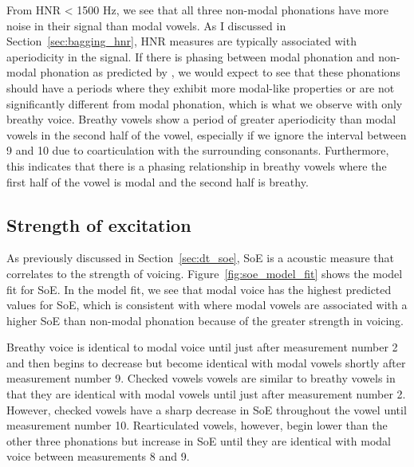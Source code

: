 From HNR < 1500 Hz, we see that all three non-modal phonations have more noise in their signal than modal vowels. As I discussed in Section~\ref{sec:bagging_hnr}, HNR measures are typically associated with aperiodicity in the signal. If there is phasing between modal phonation and non-modal phonation as predicted by \citet{silvermanLaryngealComplexityOtomanguean1997}, we would expect to see that these phonations should have a periods where they exhibit more modal-like properties or are not significantly different from modal phonation, which is what we observe with only breathy voice. Breathy vowels show a period of greater aperiodicity than modal vowels in the second half of the vowel, especially if we ignore the interval between 9 and 10 due to coarticulation with the surrounding consonants. Furthermore, this indicates that there is a phasing relationship in breathy vowels where the first half of the vowel is modal and the second half is breathy. 
\subsection{Strength of excitation} \label{sec:model_soe}

As previously discussed in Section~\ref{sec:dt_soe}, SoE is a acoustic measure that correlates to the strength of voicing. Figure~\ref{fig:soe_model_fit} shows the model fit for SoE. In the model fit, we see that modal voice has the highest predicted values for SoE, which is consistent with \citet{garellekVoicingGlottalConsonants2021} where modal vowels are associated with a higher SoE than non-modal phonation because of the greater strength in voicing. 

Breathy voice is identical to modal voice until just after measurement number 2 and then begins to decrease but become identical with modal vowels shortly after measurement number 9. Checked vowels vowels are similar to breathy vowels in that they are identical with modal vowels until just after measurement number 2. However, checked vowels have a sharp decrease in SoE throughout the vowel until measurement number 10. Rearticulated vowels, however, begin lower than the other three phonations but increase in SoE until they are identical with modal voice between measurements 8 and 9. 

